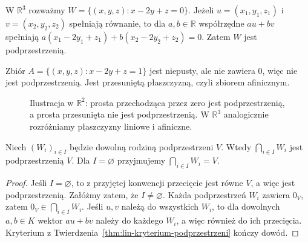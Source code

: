\begin{przyklad}
\label{prz:lin-rownania-jednorodne}
W \(\mathbb R^3\) rozważmy
\(W=\{(x,y,z):x-2y+z=0\}\).
Jeżeli \(u=(x_1,y_1,z_1)\) i \(v=(x_2,y_2,z_2)\)
spełniają równanie, to dla \(a,b\in\mathbb R\)
współrzędne \(au+bv\) spełniają
\(a(x_1-2y_1+z_1)+b(x_2-2y_2+z_2)=0\).
Zatem \(W\) jest podprzestrzenią.

Zbiór \(A=\{(x,y,z):x-2y+z=1\}\) jest niepusty,
ale nie zawiera \(0\), więc nie jest podprzestrzenią.
Jest przesuniętą płaszczyzną, czyli zbiorem afinicznym.
\end{przyklad}

\begin{figure}[!htbp]
\centering
{}
\caption{Ilustracja w \(\mathbb R^2\): prosta przechodząca
przez zero jest podprzestrzenią, a prosta przesunięta
nie jest podprzestrzenią. W \(\mathbb R^3\) analogicznie
rozróżniamy płaszczyzny liniowe i afiniczne.}
\label{fig:lin-podprzestrzen-afiniczna}
\end{figure}

\begin{twierdzenie}
\label{thm:lin-przeciecie}
Niech \((W_i)_{i\in I}\) będzie dowolną rodziną
podprzestrzeni \(V\). Wtedy \(\bigcap_{i\in I}W_i\)
jest podprzestrzenią \(V\). Dla \(I=\varnothing\)
przyjmujemy \(\bigcap_{i\in I}W_i=V\).
\end{twierdzenie}
\begin{proof}
Jeśli \(I=\varnothing\), to z przyjętej konwencji
przecięcie jest równe \(V\), a więc jest podprzestrzenią.
Załóżmy zatem, że \(I\neq\varnothing\).
Każda podprzestrzeń \(W_i\) zawiera \(0_V\),
zatem \(0_V\in\bigcap_{i\in I}W_i\).
Jeśli \(u,v\) należą do wszystkich \(W_i\),
to dla dowolnych \(a,b\in K\) wektor \(au+bv\)
należy do każdego \(W_i\), a więc również
do ich przecięcia. Kryterium z
Twierdzenia~\ref{thm:lin-kryterium-podprzestrzeni}
kończy dowód.
\end{proof}


